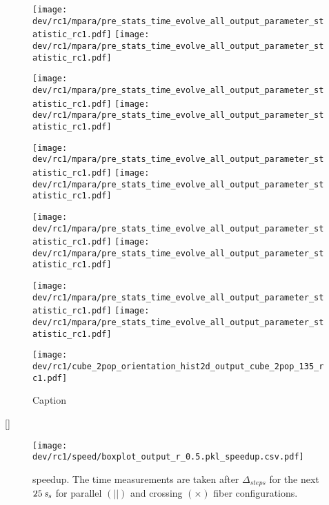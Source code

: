 \begin{sidewaysfigure}[]
\centering
\texttt{[image: dev/rc1/mpara/pre\_stats\_time\_evolve\_all\_output\_parameter\_statistic\_rc1.pdf]}
\texttt{[image: dev/rc1/mpara/pre\_stats\_time\_evolve\_all\_output\_parameter\_statistic\_rc1.pdf]}
\label{app:pste1}
\end{sidewaysfigure}
% 
\begin{sidewaysfigure}[]
\centering
\texttt{[image: dev/rc1/mpara/pre\_stats\_time\_evolve\_all\_output\_parameter\_statistic\_rc1.pdf]}
\texttt{[image: dev/rc1/mpara/pre\_stats\_time\_evolve\_all\_output\_parameter\_statistic\_rc1.pdf]}
\label{app:pste2}
\end{sidewaysfigure}
% 
\begin{sidewaysfigure}[]
\centering
\texttt{[image: dev/rc1/mpara/pre\_stats\_time\_evolve\_all\_output\_parameter\_statistic\_rc1.pdf]}
\texttt{[image: dev/rc1/mpara/pre\_stats\_time\_evolve\_all\_output\_parameter\_statistic\_rc1.pdf]}
\label{app:pste3}
\end{sidewaysfigure}
% 
\begin{sidewaysfigure}[]
\centering
\texttt{[image: dev/rc1/mpara/pre\_stats\_time\_evolve\_all\_output\_parameter\_statistic\_rc1.pdf]}
\texttt{[image: dev/rc1/mpara/pre\_stats\_time\_evolve\_all\_output\_parameter\_statistic\_rc1.pdf]}
\label{app:pste4}
\end{sidewaysfigure}
% 
\begin{sidewaysfigure}[]
\centering
\texttt{[image: dev/rc1/mpara/pre\_stats\_time\_evolve\_all\_output\_parameter\_statistic\_rc1.pdf]}
\texttt{[image: dev/rc1/mpara/pre\_stats\_time\_evolve\_all\_output\_parameter\_statistic\_rc1.pdf]}
\label{app:pste5}
\end{sidewaysfigure}
% 
\begin{figure}
    \centering
    \texttt{[image: dev/rc1/cube\_2pop\_orientation\_hist2d\_output\_cube\_2pop\_135\_rc1.pdf]}
    \caption{Caption}
    \label{fig:modelHistOrientation}
\end{figure}[]
% 
% 
\begin{figure}[!t]
\centering
\texttt{[image: dev/rc1/speed/boxplot\_output\_r\_0.5.pkl\_speedup.csv.pdf]}
\caption[ speedup]{ speedup. The time measurements are taken after $\Delta_{\mathit{steps}}$ for the next $\SI{25}{\textnormal{$\mathit{s_{s}}$}}$ for parallel $(||)$ and crossing $(\times)$ fiber configurations.}
\label{fig:solverSpeedupAll}
\end{figure}
